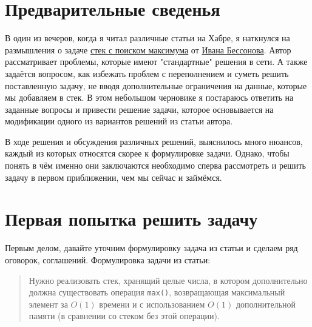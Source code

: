 \section{Предварительные сведенья}

В один из вечеров, когда я читал различные статьи на Хабре, я наткнулся на размышления о задаче \href{https://habr.com/ru/articles/843596/}{стек с поиском максимума} от \href{https://habr.com/ru/users/ibessonov/}{Ивана Бессонова}. Автор рассматривает проблемы, которые имеют "стандартные" решения в сети. А также задаётся вопросом, как избежать проблем с переполнением и суметь решить поставленную задачу, не вводя дополнительные ограничения на данные, которые мы добавляем в стек. В этом небольшом черновике я постараюсь ответить на заданные вопросы и привести решение задачи, которое основывается на модификации одного из вариантов решений из статьи автора.

В ходе решения и обсуждения различных решений, выяснилось много нюансов, каждый из которых относятся скорее к формулировке задачи. Однако, чтобы понять в чём именно они заключаются необходимо сперва рассмотреть и решить задачу в первом приближении, чем мы сейчас и займёмся.

\section{Первая попытка решить задачу}

Первым делом, давайте уточним формулировку задача из статьи и сделаем ряд оговорок, соглашений. Формулировка задачи из статьи:
\begin{quotation}
    Нужно реализовать стек, хранящий целые числа, в котором дополнительно должна существовать операция \texttt{max()}, возвращающая максимальный элемент за \(O(1)\) времени и с использованием \(O(1)\) дополнительной памяти (в сравнении со стеком без этой операции).
\end{quotation}

